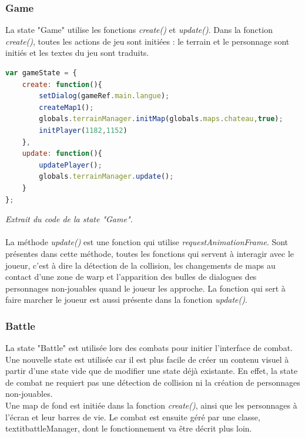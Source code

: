 \documentclass[11pt]{article}
\begin{document}
\subsubsection{Game}
La state "Game" utilise les fonctions \textit{create()} et \textit{update()}. Dans la fonction \textit{create()}, toutes les actions de jeu sont initiées : le terrain et le personnage sont initiés et les textes du jeu sont traduits.
\begin{lstlisting}[language=JavaScript]
var gameState = {
    create: function(){
        setDialog(gameRef.main.langue);
        createMap1();
        globals.terrainManager.initMap(globals.maps.chateau,true);
        initPlayer(1182,1152)
    },
    update: function(){
        updatePlayer();
        globals.terrainManager.update();
    }
};
\end{lstlisting} 
\textit{Extrait du code de la state "Game".}\\\\
La méthode \textit{update()} est une fonction qui utilise \textit{requestAnimationFrame}. Sont présentes dans cette méthode, toutes les fonctions qui servent à interagir avec le joueur, c'est à dire la détection de la collision, les changements de maps au contact d'une zone de warp et l'apparition des bulles de dialogues des personnages non-jouables quand le joueur les approche. La fonction qui sert à faire marcher le joueur est aussi présente dans la fonction \textit{update()}.
\subsubsection{Battle}
La state "Battle" est utilisée lors des combats pour initier l'interface de combat. Une nouvelle state est utilisée car il est plus facile de créer un contenu visuel à partir d'une state vide que de modifier une state déjà existante. En effet, la state de combat ne requiert pas une détection de collision ni la création de personnages non-jouables.\\

Une map de fond est initiée dans la fonction \textit{create()}, ainsi que les personnages à l'écran et leur barres de vie. Le combat est ensuite géré par une classe, textit{battleManager}, dont le fonctionnement va être décrit plus loin.
\end{document}
